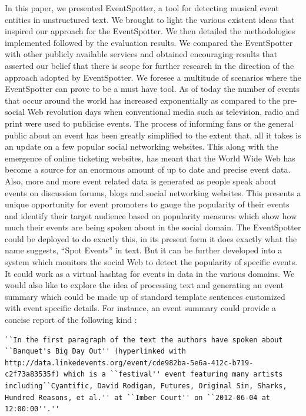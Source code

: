 \documentclass[a4paper,11pt]{report}
\begin{document}
In this paper, we presented EventSpotter, a tool for detecting musical event entities in unstructured text. We brought to light the various existent ideas that inspired our approach for the EventSpotter. We then detailed the methodologies implemented followed by the evaluation results. We compared the EventSpotter with other publicly available services and obtained encouraging results that asserted our belief that there is scope for further research in the direction of the approach adopted by EventSpotter.  We foresee a multitude of scenarios where the EventSpotter can prove to be a must have tool. As of today the number of events that occur around the world has increased exponentially as compared to the pre-social Web revolution days when conventional media such as television, radio and print were used to publicise events. The process of informing fans or the general public about an event has been greatly simplified to the extent that, all it takes is an update on a few popular social networking websites. This along with the emergence of online ticketing websites, has meant that the World Wide Web has become a source for an enormous amount of up to date and precise event data. Also, more and more event related data is generated as people speak about events on discussion forums, blogs and social networking websites. This presents a unique opportunity for event promoters to gauge the popularity of their events and identify their target audience based on popularity measures which show how much their events are being spoken about in the social domain. The EventSpotter could be deployed to do exactly this, in its present form it does exactly what the name suggests, ``Spot Events'' in text. But it can be further developed into a system which monitors the social Web to detect the popularity of specific events. It could work as a virtual hashtag for events in data in the various domains. We would also like to explore the idea of processing text and generating an event summary which could be made up of standard template sentences customized with event specific details. For instance, an event summary could provide a concise report of the following kind : \newline

\begin{lstlisting}
``In the first paragraph of the text the authors have spoken about ``Banquet's Big Day Out'' (hyperlinked with http://data.linkedevents.org/event/cde982ba-5e6a-412c-b719-c2f73a83535f) which is a ``festival'' event featuring many artists including``Cyantific, David Rodigan, Futures, Original Sin, Sharks, Hundred Reasons, et al.'' at ``Imber Court'' on ``2012-06-04 at 12:00:00''.'' 
\end{lstlisting}
\end{document}
